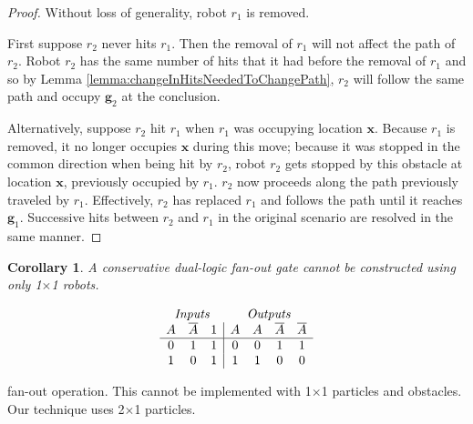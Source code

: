 \documentclass[letterpaper, 10 pt, conference]{ieeeconf}
\newtheorem{corollary}[theorem]{Corollary}
\begin{document}
\begin{proof} 
Without loss of generality, robot $r_1$ is removed. 

First suppose $r_2$ never hits $r_1$. Then the removal of $r_1$ will not affect the path of $r_2$. Robot $r_2$ has the same number of hits that it had before the removal of $r_1$ and so by Lemma \ref{lemma:changeInHitsNeededToChangePath}, $r_2$ will follow the same path and occupy $\bm{g}_2$ at the conclusion. 

Alternatively, suppose $r_2$ hit $r_1$ when $r_1$ was occupying location $\bm{x}$. Because $r_1$ is removed, it no longer occupies $\bm{x}$ during this move; because it was stopped in the common direction when being hit by $r_2$, robot $r_2$ gets stopped by this obstacle at location $\bm{x}$, previously occupied by $r_1$. $r_2$ now proceeds along the path previously traveled by $r_1$. Effectively, $r_2$ has replaced $r_1$ and follows the path until it reaches $\bm{g}_1$. Successive hits between $r_2$ and $r_1$ in the original scenario are resolved in the same manner.
\end{proof}

\begin{corollary}\label{cor:No1x1FanOut}
A  conservative dual-logic {\sc fan-out} gate cannot be constructed using only 1$\times$1 robots.
\end{corollary}

  \begin{table}
\begin{displaymath}
\begin{array}{ccc|cccc}
\multicolumn{3}{c}{\emph{Inputs}} & \multicolumn{4}{c}{\emph{Outputs}} \\
   A & \overline{A} & 1 & A & A &  \overline{A} & \overline{A}\\
\hline
0 & 1 & 1 & 0 & 0 & 1 & 1  \\
1 & 0 & 1 & 1 & 1 & 0 & 0  
\end{array}\vspace{-1em}
\end{displaymath}
\caption{{\sc fan-out} operation. This cannot be implemented with 1$\times$1 particles and obstacles. Our technique uses 2$\times$1 particles. }
  \label{tab:Fanout}\vspace{-2em}
\end{table}

\end{document}
